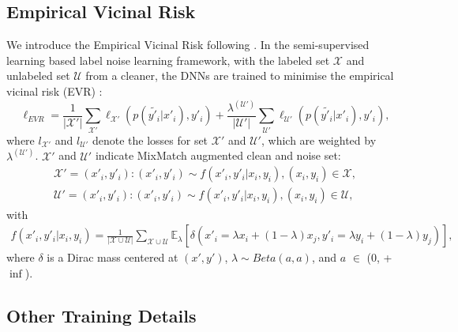 \documentclass{article} \usepackage{iclr2023_conference,times}
\begin{document}
\subsection{Empirical Vicinal Risk} \label{app:evr}
We introduce the Empirical Vicinal Risk following \citet{cordeiro2022longremix}. In the semi-supervised learning based label noise learning framework, with the labeled set $\mathcal{X}$ and unlabeled set $\mathcal{U}$ from a cleaner, the DNNs are trained to minimise the empirical vicinal risk (EVR) \citep{zhang2017mixup}:
\begin{equation} \label{eq:app:evr}
\ell_{EVR} = \frac{1}{|\mathcal{X'}|} \sum_{\mathcal{X'}} \ell_{\mathcal{X'}}(p(\tilde{y'_i}|x'_i), y'_i) + \frac{\lambda^{(\mathcal{U'})}}{|\mathcal{U'}|} \sum_{\mathcal{U'}} \ell_{\mathcal{U'}}(p(\tilde{y'_i}|x'_i), y'_i),
\end{equation}
where $l_{\mathcal{X'}}$ and $l_{\mathcal{U'}}$ denote the losses for set $\mathcal{X'}$ and $\mathcal{U'}$, which are weighted by $\lambda^{(\mathcal{U'})}$. $\mathcal{X'}$ and $\mathcal{U'}$ indicate MixMatch \citep{berthelot2019mixmatch} augmented clean and noise set:
\begin{equation} 
\begin{aligned}
\mathcal{X'} = {(x'_i,y'_i):(x'_i,y'_i) \sim f(x'_i,y'_i|x_i,y_i), (x_i,y_i) \in \mathcal{X} }, \\
\mathcal{U'} = {(x'_i,y'_i):(x'_i,y'_i) \sim f(x'_i,y'_i|x_i,y_i), (x_i,y_i) \in \mathcal{U}}, 
\end{aligned}
\end{equation}
with
\begin{equation} 
\begin{aligned}
f(x'_i,y'_i|x_i,y_i)=\frac{1}{|\mathcal{X} \cup \mathcal{U}|} \sum_{\mathcal{X} \cup \mathcal{U}} \mathbb{E}_{\lambda}[\delta(x'_i= \lambda x_i+(1-\lambda)x_j, y'_i=\lambda y_i+(1-\lambda)y_j)], 
\end{aligned}
\end{equation}
where $\delta$ is a Dirac mass centered at $(x',y')$, $\lambda \sim Beta(a,a)$, and $a$ $\in$ (0, +$\inf$).


\subsection{Other Training Details} \label{app:conig}
\end{document}
